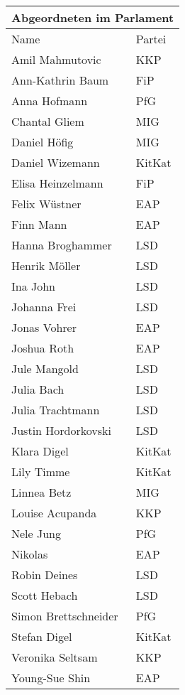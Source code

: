 \documentclass{sasbase}
\begin{document}
\begin{tabular}{ |p{5cm}|p{3cm}| }
 \hline
 \multicolumn{2}{|c|}{Abgeordneten im Parlament} \\
 \hline
 Name & Partei \\
 \hline
Amil Mahmutovic & KKP \\
Ann-Kathrin Baum & FiP\\
Anna Hofmann & PfG\\
Chantal Gliem & MIG\\
Daniel Höfig & MIG\\
Daniel Wizemann & KitKat\\
Elisa Heinzelmann & FiP\\
Felix Wüstner & EAP\\
Finn Mann & EAP\\
Hanna Broghammer & LSD\\
Henrik Möller & LSD\\
Ina John & LSD\\
Johanna Frei & LSD\\
Jonas Vohrer & EAP\\
Joshua Roth & EAP\\
Jule Mangold & LSD\\
Julia Bach & LSD\\
Julia Trachtmann & LSD\\
Justin Hordorkovski & LSD\\
Klara Digel & KitKat\\
Lily Timme & KitKat\\
Linnea Betz & MIG\\
Louise Acupanda & KKP\\
Nele Jung & PfG\\
Nikolas & EAP\\
Robin Deines & LSD\\
Scott Hebach & LSD\\
Simon Brettschneider & PfG\\
Stefan Digel & KitKat\\
Veronika Seltsam & KKP\\
Young-Sue Shin & EAP\\
 \hline
\end{tabular}
\end{document}
